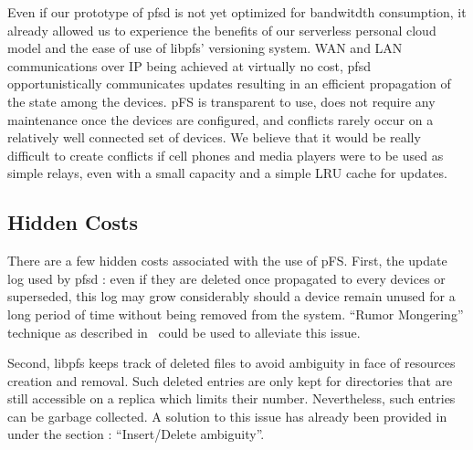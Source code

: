 Even if our prototype of pfsd is not yet optimized for bandwitdth
consumption, it already allowed us to experience the benefits of our
serverless personal cloud model and the ease of use of libpfs'
versioning system. WAN and LAN communications over IP being achieved
at virtually no cost, pfsd opportunistically communicates updates
resulting in an efficient propagation of the state among the
devices. pFS is transparent to use, does not require any maintenance
once the devices are configured, and conflicts rarely occur on a
relatively well connected set of devices. We believe that it would be
really difficult to create conflicts if cell phones and media players
were to be used as simple relays, even with a small capacity and a
simple LRU cache for updates.

\subsection{Hidden Costs}

There are a few hidden costs associated with the use of pFS. First, the
update log used by pfsd : even if they are deleted once propagated to
every devices or superseded, this log may grow considerably should a
device remain unused for a long period of time without being removed
from the system. ``Rumor Mongering'' technique as described
in~\cite{demers:epidemic} could be used to alleviate this issue.

Second, libpfs keeps track of deleted files to avoid ambiguity in face
of resources creation and removal. Such deleted entries are only kept
for directories that are still accessible on a replica which limits
their number. Nevertheless, such entries can be garbage collected. A
solution to this issue has already been provided in~\cite{page:ficus}
under the section : ``Insert/Delete ambiguity''.

\endinput


